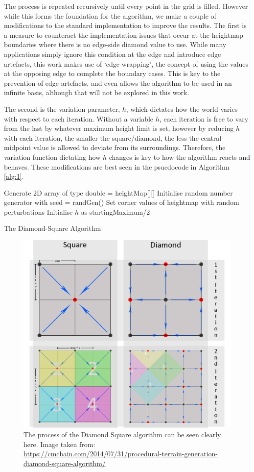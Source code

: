 \documentclass[12pt,a4paper]{article}
\begin{document}
The process is repeated recursively until every point in the grid is filled. However while this forms the foundation for the algorithm, we make a couple of modifications to the standard implementation to improve the results. The first is a measure to counteract the implementation issues that occur at the heightmap boundaries where there is no edge-side diamond value to use. While many applications simply ignore this condition at the edge and introduce edge artefacts, this work makes use of `edge wrapping', the concept of using the values at the opposing edge to complete the boundary cases. This is key to the prevention of edge artefacts, and even allows the algorithm to be used in an infinite basis, although that will not be explored in this work. 

The second is the variation parameter, $h$, which dictates how the world varies with respect to each iteration. Without a variable $h$, each iteration is free to vary from the last by whatever maximum height limit is set, however by reducing $h$ with each iteration, the smaller the square/diamond, the less the central midpoint value is allowed to deviate from its surroundings. Therefore, the variation function dictating how $h$ changes is key to how the algorithm reacts and behaves. These modifications are best seen in the psuedocode in Algorithm \ref{alg:1}.

\begin{algorithm}[H]
\SetAlgoLined
{}
Generate 2D array of type double = heightMap[][]\;
Initialise random number generator with seed = randGen()\;
Set corner values of heightmap with random perturbations\;
Initialise $h$ as startingMaximum/2\;

\caption{The Diamond-Square Algorithm }
\label{alg:1}
\end{algorithm}


\begin{figure}[ht]
  \centering
 	\includegraphics[width=0.4\linewidth]{images/diamondsquare.jpg}
	\caption[]{The process of the Diamond Square algorithm can be seen clearly here. Image taken from: \url{https://cmcbain.com/2014/07/31/procedural-terrain-generation-diamond-square-algorithm/}}
	\label{fig:3}
\end{figure} 
\end{document}

